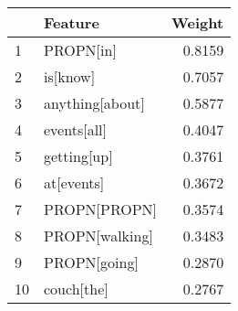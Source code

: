 \begin{tabular}{llr}
\toprule
{} &          Feature &  Weight \\
\midrule
1  &        PROPN[in] &  0.8159 \\
2  &         is[know] &  0.7057 \\
3  &  anything[about] &  0.5877 \\
4  &      events[all] &  0.4047 \\
5  &      getting[up] &  0.3761 \\
6  &       at[events] &  0.3672 \\
7  &     PROPN[PROPN] &  0.3574 \\
8  &   PROPN[walking] &  0.3483 \\
9  &     PROPN[going] &  0.2870 \\
10 &       couch[the] &  0.2767 \\
\bottomrule
\end{tabular}
